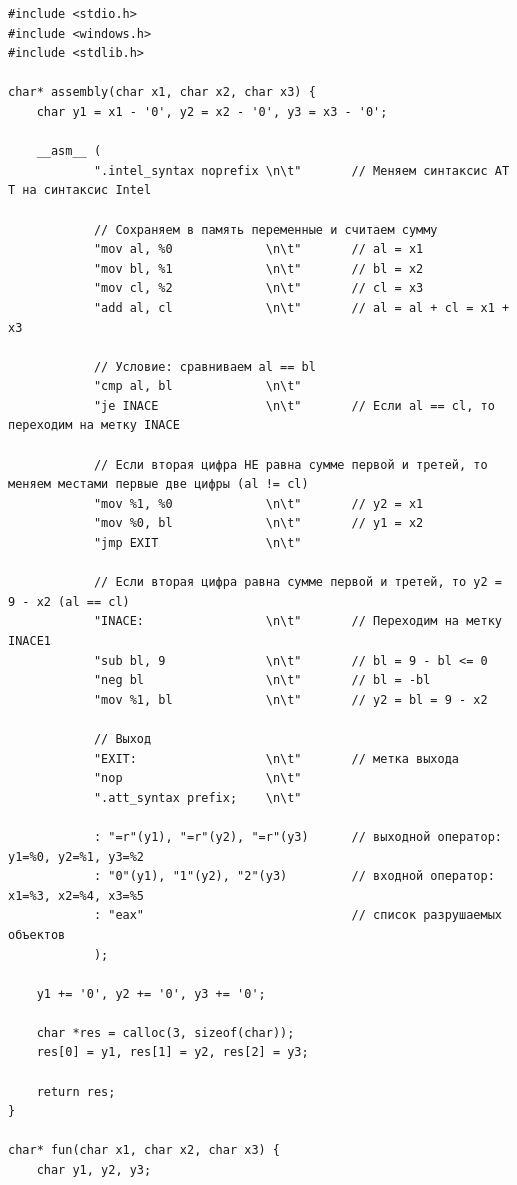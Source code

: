 \documentclass[12pt]{article}
\begin{document}
\begin{lstlisting}[label=string_code1,caption=C]
#include <stdio.h>
#include <windows.h>
#include <stdlib.h>

char* assembly(char x1, char x2, char x3) {
    char y1 = x1 - '0', y2 = x2 - '0', y3 = x3 - '0';

    __asm__ (
            ".intel_syntax noprefix \n\t"       // Меняем синтаксис AT T на синтаксис Intel

            // Сохраняем в память переменные и считаем сумму
            "mov al, %0             \n\t"       // al = x1
            "mov bl, %1             \n\t"       // bl = x2
            "mov cl, %2             \n\t"       // cl = x3
            "add al, cl             \n\t"       // al = al + cl = x1 + x3

            // Условие: сравниваем al == bl
            "cmp al, bl             \n\t"
            "je INACE               \n\t"       // Если al == cl, то переходим на метку INACE

            // Если вторая цифра НЕ равна сумме первой и третей, то меняем местами первые две цифры (al != cl)
            "mov %1, %0             \n\t"       // y2 = x1
            "mov %0, bl             \n\t"       // y1 = x2
            "jmp EXIT               \n\t"

            // Если вторая цифра равна сумме первой и третей, то y2 = 9 - x2 (al == cl)
            "INACE:                 \n\t"       // Переходим на метку INACE1
            "sub bl, 9              \n\t"       // bl = 9 - bl <= 0
            "neg bl                 \n\t"       // bl = -bl
            "mov %1, bl             \n\t"       // y2 = bl = 9 - x2

            // Выход
            "EXIT:                  \n\t"       // метка выхода
            "nop                    \n\t"
            ".att_syntax prefix;    \n\t"

            : "=r"(y1), "=r"(y2), "=r"(y3)      // выходной оператор: y1=%0, y2=%1, y3=%2
            : "0"(y1), "1"(y2), "2"(y3)         // входной оператор: x1=%3, x2=%4, x3=%5
            : "eax"                             // список разрушаемых объектов
            );

    y1 += '0', y2 += '0', y3 += '0';

    char *res = calloc(3, sizeof(char));
    res[0] = y1, res[1] = y2, res[2] = y3;

    return res;
}

char* fun(char x1, char x2, char x3) {
    char y1, y2, y3;


\end{lstlisting}
\end{document}
